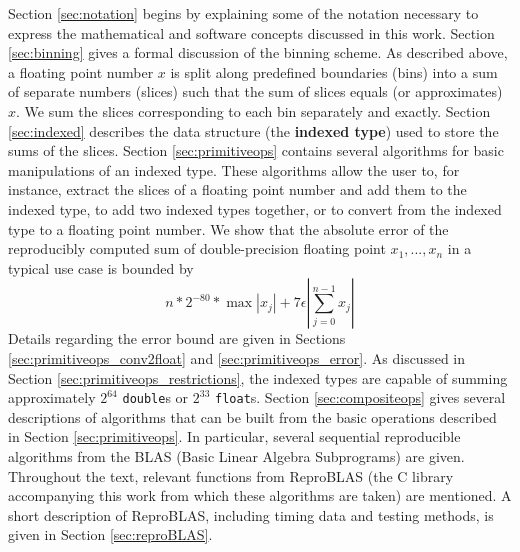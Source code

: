   Section \ref{sec:notation} begins by explaining some of the notation necessary to express the mathematical and software concepts discussed in this work.
  Section \ref{sec:binning} gives a formal discussion of the binning scheme. As described above, a floating point number $x$ is split along predefined boundaries (bins) into a sum of separate numbers (slices) such that the sum of slices equals (or approximates) $x$. We sum the slices corresponding to each bin separately and exactly.
  Section \ref{sec:indexed} describes the data structure (the \textbf{indexed type}) used to store the sums of the slices.
  Section \ref{sec:primitiveops} contains several algorithms for basic manipulations of an indexed type.  These algorithms allow the user to, for instance, extract the slices of a floating point number and add them to the indexed type, to add two indexed types together, or to convert from the indexed type to a floating point number. We show that the absolute error of the reproducibly computed sum of double-precision floating point $x_1, ..., x_n$ in a typical use case is bounded by
  \[
    n* 2^{-80} * \max|x_j| + 7 \epsilon|\sum\limits_{j = 0}^{n - 1} x_j|
  \]
  Details regarding the error bound are given in Sections \ref{sec:primitiveops_conv2float} and \ref{sec:primitiveops_error}.
  As discussed in Section \ref{sec:primitiveops_restrictions}, the indexed types are capable of summing approximately $2^{64}$ \texttt{double}s or $2^{33}$ \texttt{float}s.
  Section \ref{sec:compositeops} gives several descriptions of algorithms that can be built from the basic operations described in Section \ref{sec:primitiveops}. In particular, several sequential reproducible algorithms from the BLAS (Basic Linear Algebra Subprograms) are given.
  Throughout the text, relevant functions from ReproBLAS (the C library accompanying this work from which these algorithms are taken) are mentioned. A short description of ReproBLAS, including timing data and testing methods, is given in Section \ref{sec:reproBLAS}.
